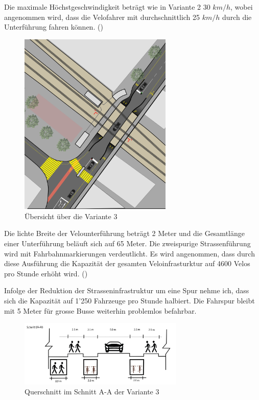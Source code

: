 Die maximale Höchstgeschwindigkeit beträgt wie in Variante 2 30 $km/h$, wobei angenommen wird, dass die Velofahrer mit durchschnittlich 25 $km/h$ durch die Unterführung fahren können. (\cite{Mikrozensus2015})


\begin{figure}[h!]
	\centering
	\includegraphics[width=0.65\textwidth]{figures/f-04-05-03-a-V3}
	\caption[Übersicht Variante 3]{Übersicht über die Variante 3}
	\label{img:V3Ü}
\end{figure}

Die lichte Breite der Velounterführung beträgt 2 Meter und die Gesamtlänge einer Unterführung beläuft sich auf 65 Meter. Die zweispurige Strassenführung wird mit Fahrbahnmarkierungen verdeutlicht. Es wird angenommen, dass durch diese Ausführung die Kapazität der gesamten Veloinfrasturktur auf 4600 Velos pro Stunde erhöht wird. (\cite{Nacto2018})

Infolge der Reduktion der Strasseninfrastruktur um eine Spur nehme ich, dass sich die Kapazität auf 1'250 Fahrzeuge pro Stunde halbiert. Die Fahrspur bleibt mit 5 Meter für grosse Busse weiterhin problemlos befahrbar.

\begin{figure}[h!]
	\centering
	\includegraphics[width=0.7\textwidth]{figures/f-04-05-03-b-V3}
	\caption[Querschnitt Variante 3]{Querschnitt im Schnitt A-A der Variante 3}
	\label{img:V3Q}
\end{figure}

